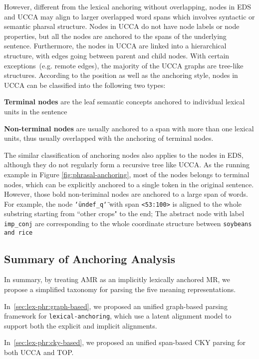 However, different from the lexical anchoring without overlapping,
nodes in EDS and UCCA may align to larger overlapped word spans which
involves syntactic or semantic pharsal structure. Nodes in UCCA do not
have node labels or node properties, but all the nodes are anchored to
the spans of the underlying sentence. Furthermore, the nodes in UCCA
are linked into a hierarchical structure, with edges going between
parent and child nodes. With certain exceptions~(e.g. remote edges),
the majority of the UCCA graphs are tree-like structures. According to
the position as well as the anchoring style, nodes in UCCA can be
classified into the following two types:

\begin{inparaenum}
\item \textbf{Terminal nodes} are the leaf semantic
  concepts anchored to individual lexical units in the sentence

\item \textbf{Non-terminal nodes} are usually anchored to a span with
  more than one lexical units, thus usually overlapped with the
  anchoring of terminal nodes.
\end{inparaenum}

The similar classification of anchoring nodes also applies to the
nodes in EDS, although they do not regularly form a recursive tree
like UCCA. As the running example in Figure
\ref{fig:phrasal-anchoring}, most of the nodes belongs to terminal
nodes, which can be explicitly anchored to a single token in the
original sentence. However, those bold non-teriminal nodes are
anchored to a large span of words. For example, the node
\texttt{\char`\"undef\_q\char`\"} with span \texttt{<53:100>} is
aligned to the whole substring starting from ``other crops" to the
end; The abstract node with label \texttt{imp\_conj} are corresponding
to the whole coordinate structure between \texttt{soybeans and rice}

\subsection{Summary of Anchoring Analysis}
\label{ssec:lex-phr:summary-anchoring}

In summary, by treating AMR as an implicitly lexically anchored MR, we
propose a simplified taxonomy for parsing the five meaning
representations.

In~\autoref{sec:lex-phr:graph-based}, we proposed an unified
graph-based parsing framework for \texttt{lexical-anchoring}, which
use a latent alignment model to support both the explicit and implicit
alignments.

In~\autoref{sec:lex-phr:cky-based}, we proposed an unified span-based
CKY parsing for both UCCA and TOP.

